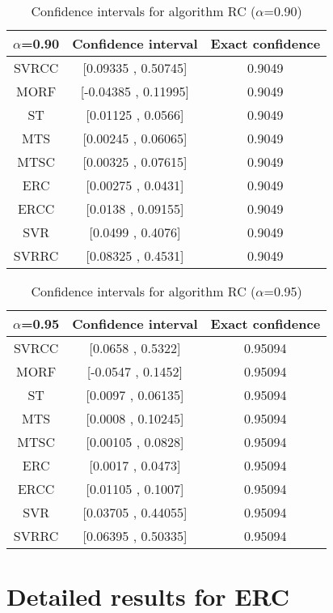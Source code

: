 \documentclass[a4paper,10pt]{article}
\begin{document}
\begin{table}[!htp]
\centering\small
\begin{tabular}{
|c|c|c|}
\hline
 $\alpha$=0.90 & Confidence interval & Exact confidence \\ \hline 
SVRCC & [0.09335 , 0.50745] & 0.9049\\ \hline 
MORF & [-0.04385 , 0.11995] & 0.9049\\ \hline 
ST & [0.01125 , 0.0566] & 0.9049\\ \hline 
MTS & [0.00245 , 0.06065] & 0.9049\\ \hline 
MTSC & [0.00325 , 0.07615] & 0.9049\\ \hline 
ERC & [0.00275 , 0.0431] & 0.9049\\ \hline 
ERCC & [0.0138 , 0.09155] & 0.9049\\ \hline 
SVR & [0.0499 , 0.4076] & 0.9049\\ \hline 
SVRRC & [0.08325 , 0.4531] & 0.9049\\ \hline 

\end{tabular}
\caption{Confidence intervals for algorithm RC ($\alpha$=0.90)}
\end{table}
\begin{table}[!htp]
\centering\small
\begin{tabular}{
|c|c|c|}
\hline
 $\alpha$=0.95 & Confidence interval & Exact confidence \\ \hline 
SVRCC & [0.0658 , 0.5322] & 0.95094\\ \hline 
MORF & [-0.0547 , 0.1452] & 0.95094\\ \hline 
ST & [0.0097 , 0.06135] & 0.95094\\ \hline 
MTS & [0.0008 , 0.10245] & 0.95094\\ \hline 
MTSC & [0.00105 , 0.0828] & 0.95094\\ \hline 
ERC & [0.0017 , 0.0473] & 0.95094\\ \hline 
ERCC & [0.01105 , 0.1007] & 0.95094\\ \hline 
SVR & [0.03705 , 0.44055] & 0.95094\\ \hline 
SVRRC & [0.06395 , 0.50335] & 0.95094\\ \hline 

\end{tabular}
\caption{Confidence intervals for algorithm RC ($\alpha$=0.95)}
\end{table}

 \clearpage 


\section{Detailed results for ERC}
\end{document}
